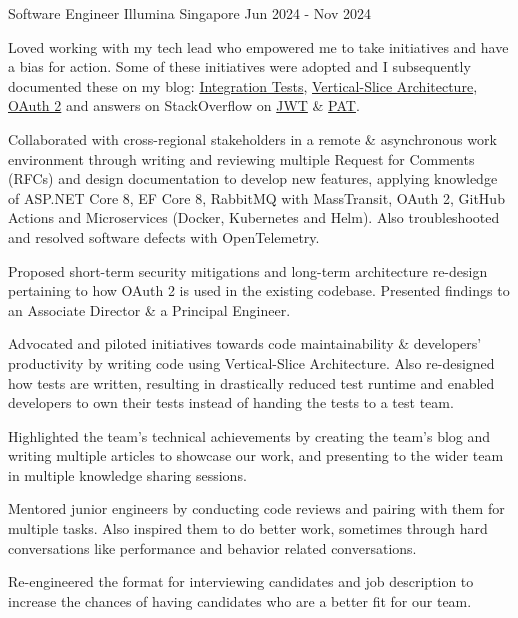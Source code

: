 \begin{cventries}
\cventry
{Software Engineer} %
{Illumina} %
{Singapore} %
{Jun 2024 - Nov 2024} %
{
  \begin{cvitems} %
    \item {Loved working with my tech lead who empowered me to take initiatives and have a bias for action. Some of these initiatives were adopted and I subsequently documented these on my blog: \href{https://bit.ly/zy-tests}{Integration Tests}, \href{https://bit.ly/zy-vsa}{Vertical-Slice Architecture}, \href{https://bit.ly/zy-oauth2}{OAuth 2} and answers on StackOverflow on \href{https://bit.ly/zy-jwt}{JWT} \& \href{https://bit.ly/zy-pat}{PAT}.}
    \item {Collaborated with cross-regional stakeholders in a remote \& asynchronous work environment through writing and reviewing multiple Request for Comments (RFCs) and design documentation to develop new features, applying knowledge of ASP.NET Core 8, EF Core 8, RabbitMQ with MassTransit, OAuth 2, GitHub Actions and Microservices (Docker, Kubernetes and Helm). Also troubleshooted and resolved software defects with OpenTelemetry.}
    \item {Proposed short-term security mitigations and long-term architecture re-design pertaining to how OAuth 2 is used in the existing codebase. Presented findings to an Associate Director \& a Principal Engineer.}
    \item {Advocated and piloted initiatives towards code maintainability \& developers' productivity by writing code using Vertical-Slice Architecture. Also re-designed how tests are written, resulting in drastically reduced test runtime and enabled developers to own their tests instead of handing the tests to a test team.}
    \item {Highlighted the team's technical achievements by creating the team's blog and writing multiple articles to showcase our work, and presenting to the wider team in multiple knowledge sharing sessions.}
    \item {Mentored junior engineers by conducting code reviews and pairing with them for multiple tasks. Also inspired them to do better work, sometimes through hard conversations like performance and behavior related conversations.}
    \item {Re-engineered the format for interviewing candidates and job description to increase the chances of having candidates who are a better fit for our team.}
  \end{cvitems}
}


\end{cventries}
